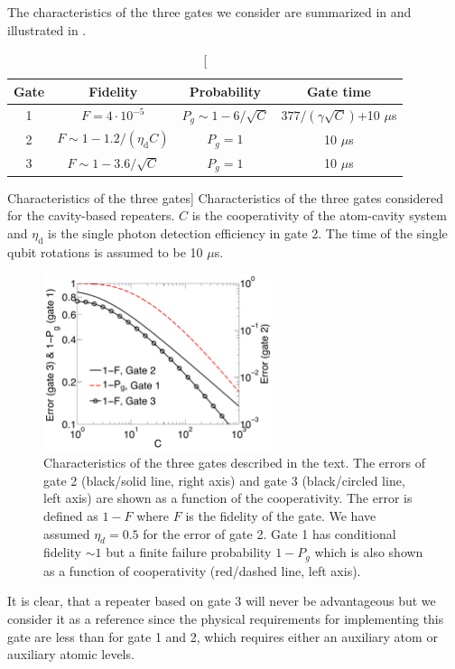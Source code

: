 The characteristics of the three gates we consider are summarized in
 and illustrated in .
\begin{table} 
\centering
\begin{tabular}{|c|c|c|c|}
\hline
Gate & Fidelity & Probability & Gate time  \\ \hline
1  & $F=4\cdot10^{-5}$ & $P_{g}\sim1-6/\sqrt{C}$ & $377/(\gamma\sqrt{C})$+10 $\mu$s\\ \hline
2 & $F\sim1-1.2/(\eta_{\text{d}}C)$ & $P_{g}=1$ &10 $\mu$s  \\ \hline
3 & $F\sim1-3.6/\sqrt{C}$ & $P_{g}=1$ &10 $\mu$s \\ \hline
\end{tabular}
\caption
[Characteristics of the three gates]
{Characteristics of the three gates considered for the
cavity-based repeaters. $C$ is the cooperativity of the atom-cavity system and
$\eta_{\text{d}}$ is the single photon detection efficiency in gate 2. The time
of the single qubit rotations is assumed to be 10 $\mu$s. }
\label{tab:table2}
\end{table}
\begin{figure} 
\centering
\includegraphics[width=0.6\textwidth]{./figs_Borregaard_PRA2015/figureX2}
\caption[CNOT gates comparison]{Characteristics of the three gates described in
the text. The errors of gate 2 (black/solid line, right axis) and gate 3
(black/circled line, left axis) are shown as a function of the cooperativity.
The error is defined as $1-F$ where $F$ is the fidelity of the gate. We have
assumed $\eta_{d}=0.5$ for the error of gate 2. Gate 1 has conditional fidelity
$\sim1$ but a finite failure probability $1-P_{g}$ which is also shown as a
function of cooperativity (red/dashed line, left axis).}
\label{fig:figureX2}
\end{figure} 
It is clear, that a repeater based on gate 3 will never be advantageous but we
consider it as a reference since the physical requirements for implementing this
gate are less than for gate 1 and 2, which requires either an auxiliary atom or
auxiliary atomic levels.

